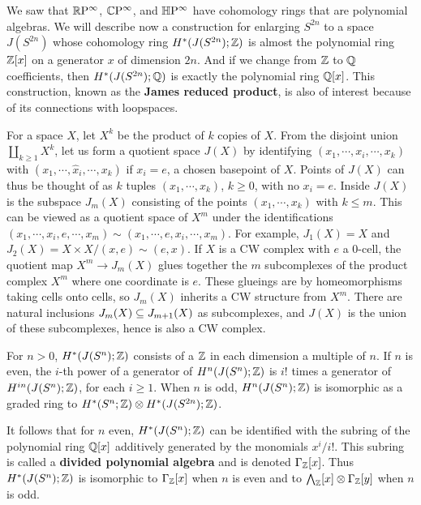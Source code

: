 We saw that $\mathbb{R}\mathrm{P}^\infty$, $\mathbb{C}\mathrm{P}^\infty$, and $\mathbb{H}\mathrm{P}^\infty$ have cohomology rings that are polynomial algebras. We will describe now a construction for enlarging 
$S^{2n}$ to a space $J(S^{2n})$ whose cohomology ring $H^*(J(S^{2n});\mathbb{Z})$ is almost the polynomial ring $\mathbb{Z}[x]$ on a generator $x$ of dimension $2n$. And if we change 
from $\mathbb{Z}$ to $\mathbb{Q}$ coefficients, then $H^*(J(S^{2n});\mathbb{Q})$ is exactly the polynomial ring $\mathbb{Q}[x]$. This construction, known as the \textbf{James reduced product}, is also 
of interest because of its connections with loopspaces.\par
For a space $X$, let $X^k$ be the product of $k$ copies of $X$. From the disjoint union $\coprod_{k\geq 1}X^k$, let us form a quotient space $J(X)$ by identifying 
$(x_1,\cdots,x_i,\cdots,x_k)$ with $(x_1,\cdots,\widehat{x}_i,\cdots,x_k)$ if $x_i=e$, a chosen basepoint of $X$. Points of $J(X)$ can thus be thought of as $k$ tuples 
$(x_1,\cdots,x_k)$, $k\geq 0$, with no $x_i=e$. Inside $J(X)$ is the subspace $J_m(X)$ consisting of the points $(x_1,\cdots,x_k)$ with $k\leq m$. This can be viewed 
as a quotient space of $X^m$ under the identifications $(x_1,\cdots,x_i,e,\cdots,x_m)\sim (x_1,\cdots,e,x_i,\cdots,x_m)$. For example, $J_1(X)=X$ and 
$J_2(X)=X\times X/(x,e)\sim(e,x)$. If $X$ is a CW complex with $e$ a $0$-cell, the quotient map $X^m\to J_m(X)$ glues together
the $m$ subcomplexes of the product complex $X^m$ where one coordinate is $e$. These glueings are by homeomorphisms taking cells onto cells, so $J_m(X)$ inherits a 
CW structure from $X^m$. There are natural inclusions $J_m(X)\subseteq J_{m+1}(X)$ as subcomplexes, and $J(X)$ is the union of these subcomplexes, hence is also a CW complex.
\begin{proposition}
For $n>0$, $H^*(J(S^n);\mathbb{Z})$ consists of a $\mathbb{Z}$ in each dimension a multiple of $n$. If $n$ is even, the $i$-th power of a generator of $H^n(J(S^n);\mathbb{Z})$ is $i!$ times a generator of $H^{in}(J(S^n);\mathbb{Z})$, for each $i\geq1$. When $n$ is odd, $H^n(J(S^n);\mathbb{Z})$ is isomorphic as a graded ring to $H^*(S^n;\mathbb{Z})\otimes H^*(J(S^{2n});\mathbb{Z})$.
\end{proposition}
It follows that for $n$ even, $H^*(J(S^n);\mathbb{Z})$ can be identified with the subring of the polynomial ring $\mathbb{Q}[x]$ additively generated by the monomials $x^i/i!$. This subring is called a \textbf{divided polynomial algebra} and is denoted $\Gamma_{\mathbb{Z}}[x]$. Thus $H^*(J(S^n);\mathbb{Z})$ is isomorphic to $\Gamma_{\mathbb{Z}}[x]$ when $n$ is even and to $\bigwedge_{\mathbb{Z}}[x]\otimes\Gamma_{\mathbb{Z}}[y]$ when $n$ is odd.
